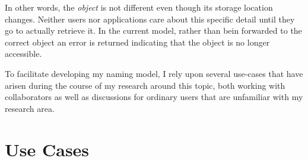 In other words, the \emph{object} is not different even though its storage
location changes.  Neither users nor applications care about this
specific detail until they go to actually retrieve it.  In the current model,
rather than bein forwarded to the correct object an error is returned indicating
that the object is no longer accessible.

To facilitate developing my naming model, I rely upon several use-cases that
have arisen during the course of my research around this topic, both working
with collaborators as well as discussions for ordinary users that are unfamiliar
with my research area. 

\section{Use Cases}
\label{ch:model:sec:use-cases}

